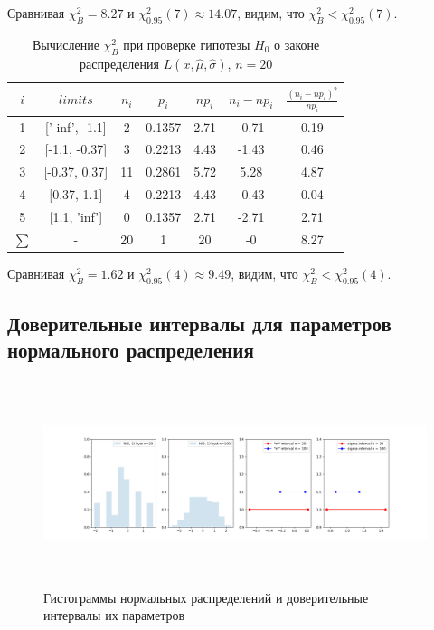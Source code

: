 \documentclass[a4paper,14pt]{article}
\begin{document}
	\noindent Сравнивая $\chi^{2}_{B} = 8.27$ и $\chi^{2}_{0.95}(7) \approx 14.07$, видим, что $\chi^{2}_{B} < \chi^{2}_{0.95}(7)$.
	\\
	
	\begin{table}[H]
		\centering
		\begin{tabular}{| c | c | c | c | c | c | c |}
			\hline
			$i$ & $limits$         &   $n_i$ &    $p_i$ &   $np_i$ &   $n_i - np_i$ &   $\frac{(n_i-np_i)^2}{np_i}$ \\
			\hline
			1 & ['-inf', -1.1] &     2 & 0.1357 &   2.71 &        -0.71 &                        0.19 \\
			2 & [-1.1, -0.37]  &     3 & 0.2213 &   4.43 &        -1.43 &                        0.46 \\
			3 & [-0.37, 0.37]  &    11 & 0.2861 &   5.72 &         5.28 &                        4.87 \\
			4 & [0.37, 1.1]    &     4 & 0.2213 &   4.43 &        -0.43 &                        0.04 \\
			5 & [1.1, 'inf']   &     0 & 0.1357 &   2.71 &        -2.71 &                        2.71 \\
			$\sum$ & -              &    20 & 1      &  20    &        -0    &                        8.27 \\
			\hline
		\end{tabular}
		\caption{ Вычисление $\chi^{2}_{B}$ при проверке гипотезы $H_{0}$ о законе распределения $L(x,\hat{\mu}, \hat{\sigma})$, $n=20$}
		\label{tab:laplace_chi_2}
	\end{table}
	
	\noindent Сравнивая $\chi^{2}_{B} = 1.62$ и $\chi^{2}_{0.95}(4) \approx 9.49$, видим, что $\chi^{2}_{B} < \chi^{2}_{0.95}(4)$.
	\\
	
	\subsection{Доверительные интервалы для параметров нормального распределения}
	\begin{figure}[H]
		\centering
		\includegraphics[width = 20cm, height = 6cm]{../image/lab8_1.png}
		\caption{Гистограммы нормальных распределений и доверительные интервалы их параметров}
		\label{w_pert}
	\end{figure}
	
\end{document}
